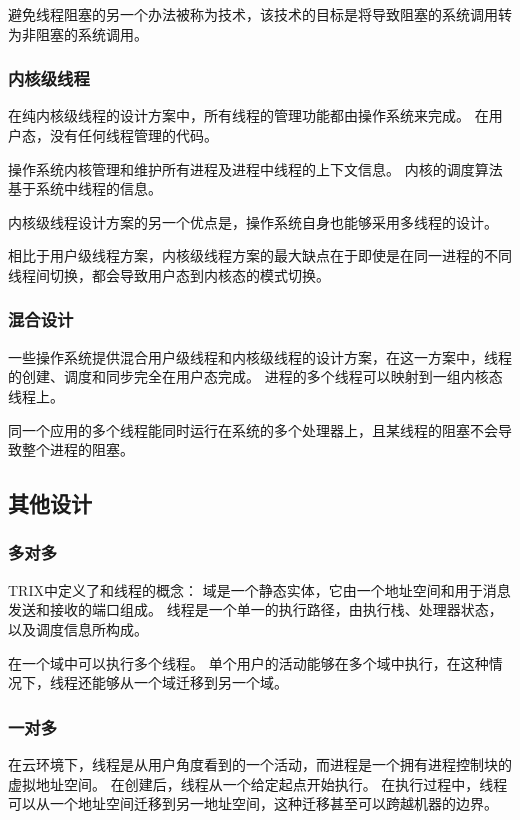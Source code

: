 {{{            避免线程阻塞的另一个办法被称为技术，该技术的目标是将导致阻塞的系统调用转为非阻塞的系统调用。
        }

        \subsubsection{内核级线程}
        {
            在纯内核级线程的设计方案中，所有线程的管理功能都由操作系统来完成。
            在用户态，没有任何线程管理的代码。

            操作系统内核管理和维护所有进程及进程中线程的上下文信息。
            内核的调度算法基于系统中线程的信息。

            内核级线程设计方案的另一个优点是，操作系统自身也能够采用多线程的设计。

            相比于用户级线程方案，内核级线程方案的最大缺点在于即使是在同一进程的不同线程间切换，都会导致用户态到内核态的模式切换。
        }

        \subsubsection{混合设计}
        {
            一些操作系统提供混合用户级线程和内核级线程的设计方案，在这一方案中，线程的创建、调度和同步完全在用户态完成。
            进程的多个线程可以映射到一组内核态线程上。

            同一个应用的多个线程能同时运行在系统的多个处理器上，且某线程的阻塞不会导致整个进程的阻塞。
        }
    }

    \subsection{其他设计}
    {
        \subsubsection{多对多}
        {
            TRIX中定义了和线程的概念：
            域是一个静态实体，它由一个地址空间和用于消息发送和接收的端口组成。
            线程是一个单一的执行路径，由执行栈、处理器状态，以及调度信息所构成。

            在一个域中可以执行多个线程。
            单个用户的活动能够在多个域中执行，在这种情况下，线程还能够从一个域迁移到另一个域。
        }

        \subsubsection{一对多}
        {
            在云环境下，线程是从用户角度看到的一个活动，而进程是一个拥有进程控制块的虚拟地址空间。
            在创建后，线程从一个给定起点开始执行。
            在执行过程中，线程可以从一个地址空间迁移到另一地址空间，这种迁移甚至可以跨越机器的边界。
        }
    }
}

